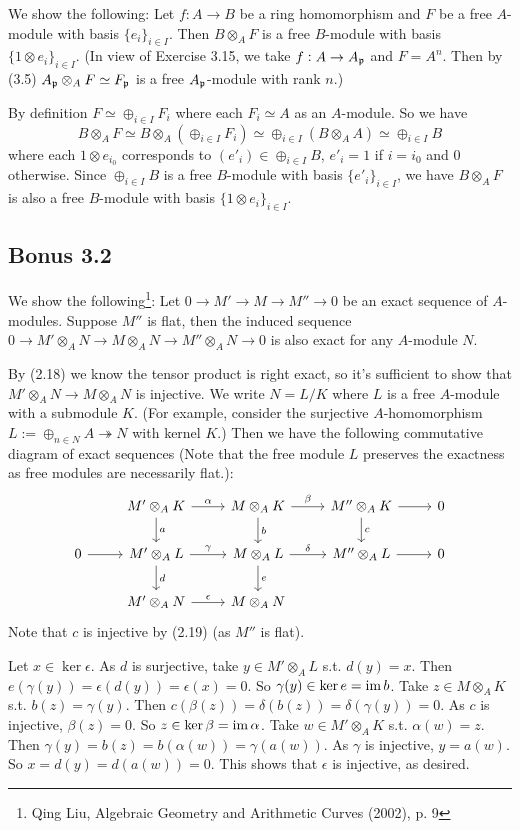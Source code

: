 \documentclass[../A&M.tex]{subfiles}
\begin{document}
We show the following: Let $f: A\to B$ be a ring homomorphism and $F$ be a free $A$-module with basis $\{e_i\}_{i\in I}$. Then $B \otimes_A F$ is a free $B$-module with basis $\{1 \otimes e_i\}_{i\in I}$. (In view of Exercise 3.15, we take $f: A \to A_{\mathfrak{p}}$ and $F=A^n$. Then by (3.5) $A_{\mathfrak{p}} \otimes_A F \simeq F_{\mathfrak{p}}$ is a free $A_{\mathfrak{p}}$-module with rank $n$.)

By definition $F \simeq \oplus_{i\in I} F_i$ where each $F_i \simeq A$ as an $A$-module. So we have
$$
B \otimes_A F \simeq B \otimes_A (\oplus_{i\in I} F_i) \simeq \oplus_{i\in I} (B \otimes_A A) \simeq \oplus_{i\in I} B
$$
where each $1 \otimes e_{i_0}$ corresponds to $(e'_i) \in \oplus_{i\in I} B$, $e'_i = 1$ if $i=i_0$ and $0$ otherwise. Since $\oplus_{i\in I} B$ is a free $B$-module with basis $\{e'_i\}_{i\in I}$, we have $B \otimes_A F$ is also a free $B$-module with basis $\{1 \otimes e_i\}_{i\in I}$.

\subsection*{Bonus 3.2} \label{Bonus 3.2}

We show the following\footnote{Qing Liu, Algebraic Geometry and
Arithmetic Curves (2002), p. 9}: Let $0 \to M' \to M \to M'' \to 0$ be an
exact sequence of $A$-modules. Suppose $M''$ is flat, then the induced sequence $0 \to M' \otimes_A N \to M \otimes_A N \to M'' \otimes_A N \to 0$ is also exact for any $A$-module $N$.

By (2.18) we know the tensor product is right exact, so it's sufficient to show that $M' \otimes_A N \to M \otimes_A N$ is injective. We write $N=L/K$ where $L$ is a free $A$-module with a submodule $K$. (For example, consider the surjective $A$-homomorphism $L := \oplus_{n\in N} A \twoheadrightarrow N$ with kernel $K$.) Then we have the following commutative diagram of exact sequences (Note that the free module $L$ preserves the exactness as free modules are necessarily flat.):
$$
\begin{tikzcd}
	& M' \otimes_A K \arrow[r, "\alpha"] \arrow[d, "a"] & M \otimes_A K \arrow[r, "\beta"] \arrow[d, "b"] & M'' \otimes_A K \arrow{r} \arrow[d, "c"] & 0 \\ 
0 \arrow{r} & M' \otimes_A L \arrow[r, "\gamma"] \arrow[d, "d"] & M \otimes_A L \arrow[r, "\delta"] \arrow[d, "e"] & M'' \otimes_A L \arrow[r] & 0 \\
	& M' \otimes_A N \arrow[r, "\epsilon"] & M \otimes_A N & &
\end{tikzcd}
$$
Note that $c$ is injective by (2.19) (as $M''$ is flat).

Let $x \in \ker \epsilon$. As $d$ is surjective, take $y \in M' \otimes_A L$ s.t. $d(y)=x$. Then $e(\gamma(y)) = \epsilon(d(y)) = \epsilon(x) = 0$. So $\gamma(y) \in \ker e = \operatorname{im} b$. Take $z \in M \otimes_A K$ s.t. $b(z)=\gamma(y)$. Then $c(\beta(z)) = \delta(b(z)) = \delta(\gamma(y)) = 0$. As $c$ is injective, $\beta(z)=0$. So $z\in \ker \beta = \operatorname{im} \alpha$. Take $w\in M' \otimes_A K$ s.t. $\alpha(w) = z$. Then $\gamma(y) = b(z) = b(\alpha(w)) = \gamma(a(w))$. As $\gamma$ is injective, $y=a(w)$. So $x = d(y) = d(a(w)) = 0$. This shows that $\epsilon$ is injective, as desired.
\end{document}
